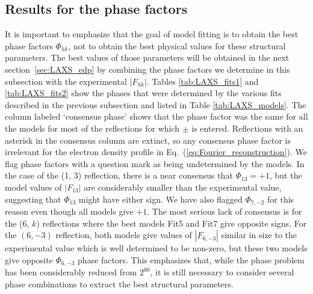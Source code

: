 \subsection{Results for the phase factors}\label{sec:LAXS_phases_results}
It is important to emphasize that the goal of model fitting is to obtain the 
best phase factors $\Phi_{hk}$, not to obtain the best physical values for these 
structural parameters.  The best values of those parameters will be obtained 
in the next section~\ref{sec:LAXS_edp} by combining the phase factors we 
determine in this subsection with the experimental $|F_{hk}|$.  
Tables \ref{tab:LAXS_fits1} and \ref{tab:LAXS_fits2} show the phases that 
were determined by the various fits described in the previous subsection and 
listed in Table \ref{tab:LAXS_models}. The column labeled `consensus phase'
shows that the phase factor was the same for all the models for most of the 
reflections for which $\pm$ is entered.  Reflections with an asterisk in the 
consensus column are extinct, so any consensus phase factor is irrelevant for 
the electron density profile in Eq.~(\ref{eq:Fourier_reconstruction}). 
We flag phase factors with a question 
mark as being undetermined by the models.  In the case of the (1, 3) reflection, 
there is a near consensus that $\Phi_{13}=+1$, but the model values of 
$|F_{13}|$ are considerably smaller than the experimental value, suggesting 
that $\Phi_{13}$ might have either sign.  We have also flagged $\Phi_{7,-2}$ 
for this reason even though all models give $+1$. The most serious lack of 
consensus is for the (6, $k$) reflections where the best models Fit5 and Fit7 
give opposite signs. For the $(6,-3)$ reflection, both models give values of 
$|F_{6,-3}|$ similar in size to the experimental value which is well 
determined to be non-zero, but these two models give opposite $\Phi_{6,-3}$ 
phase factors.  This emphasizes that, while the phase problem has been 
considerably reduced from $2^{60}$, it is still necessary to consider several 
phase combinations to extract the best structural parameters.
